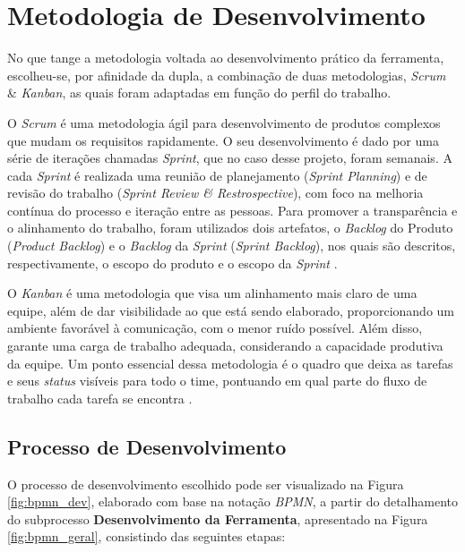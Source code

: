 \section{Metodologia de Desenvolvimento}

\label{sec:metodologia_desenvolvimento}

No que tange a metodologia voltada ao desenvolvimento prático da ferramenta, escolheu-se, por afinidade da dupla, a combinação de duas metodologias, \textit{Scrum} \& \textit{Kanban}, as quais foram adaptadas em função do perfil do trabalho.

O \textit{Scrum} é uma metodologia ágil para desenvolvimento de produtos complexos que mudam os requisitos rapidamente. O seu desenvolvimento é dado por uma série de iterações chamadas \textit{Sprint}, que no caso desse projeto, foram semanais. A cada \textit{Sprint} é realizada uma reunião de planejamento (\textit{Sprint Planning}) e de revisão do trabalho (\textit{Sprint Review \& Restrospective}), com foco na melhoria contínua do processo e iteração entre as pessoas. Para promover a transparência e o alinhamento do trabalho, foram utilizados dois artefatos, o \textit{Backlog} do Produto (\textit{Product Backlog}) e o \textit{Backlog} da \textit{Sprint} (\textit{Sprint Backlog}), nos quais  são descritos, respectivamente, o
escopo do produto e o escopo da \textit{Sprint} \cite{carolipaulo2021}.

O \textit{Kanban} é uma metodologia que visa um alinhamento mais claro de uma equipe, além de dar visibilidade ao que está sendo elaborado, proporcionando um ambiente favorável à comunicação, com o menor ruído possível. Além disso, garante uma carga de trabalho adequada, considerando a capacidade produtiva da equipe. Um ponto essencial dessa metodologia é o quadro que deixa as tarefas e seus \textit{status} visíveis para todo o time, pontuando em qual parte do fluxo de trabalho cada tarefa se encontra \cite{K_Condensed}.

\subsection{Processo de Desenvolvimento}

\label{sec:met_dev}

O processo de desenvolvimento escolhido pode ser visualizado na Figura \ref{fig:bpmn_dev}, elaborado com base na notação \textit{BPMN},  a partir do detalhamento do subprocesso \textbf{Desenvolvimento da Ferramenta}, apresentado na Figura \ref{fig:bpmn_geral}, consistindo das seguintes etapas:

